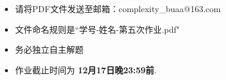\documentclass[11pt,addpoints,answers]{exam}
\newcommand{\duedate}{12月17日晚23:59前} %
\begin{document}
\pagestyle{head}                %

\pagestyle{head}                %

\begin{itemize}
	\item 请将PDF文件发送至邮箱：complexity\_buaa@163.com
	\item 文件命名规则是``学号-姓名-第五次作业.pdf"
	\item 务必独立自主解题
	\item 作业截止时间为 \textbf{\duedate}.
\end{itemize}

\medskip


 

\end{document}

